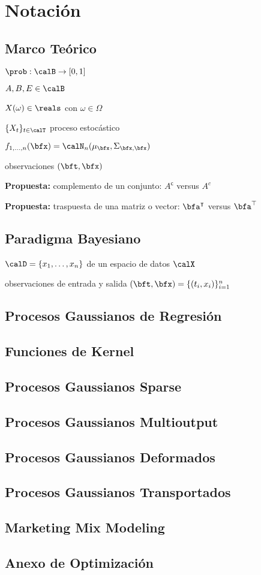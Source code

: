 \chapter{Notación}

\section{Marco Teórico}
\(\prob : \calB \to [0, 1]\)

\(A,B,E \in \calB\)

\(X(\omega) \in \reals\) con \(\omega \in \Omega\)

\(\{X_t\}_{t \in \calT}\) proceso estocástico

\(f_{1, \dotsc, n}(\bfx) = \calN_{n} (\mu_{\bfx}, \Sigma_{\bfx,\bfx})\)

observaciones \((\bft,\bfx)\)

\textbf{Propuesta:} complemento de un conjunto: \(A^\mathsf{c}\) versus \(A^c\)

\textbf{Propuesta:} traspuesta de una matriz o vector: \(\bfa^\intercal\) versus \(\bfa^\top\)

\section{Paradigma Bayesiano}
\(\calD = \{x_1, \dotsc, x_n\}\) de un espacio de datos \( \calX\)



observaciones de entrada y salida \((\bft, \bfx) = \{(t_i, x_i)\}_{i=1}^n\)


\section{Procesos Gaussianos de Regresión}

\section{Funciones de Kernel}

\section{Procesos Gaussianos Sparse}

\section{Procesos Gaussianos Multioutput}

\section{Procesos Gaussianos Deformados}

\section{Procesos Gaussianos Transportados}

\section{Marketing Mix Modeling}

\section{Anexo de Optimización}